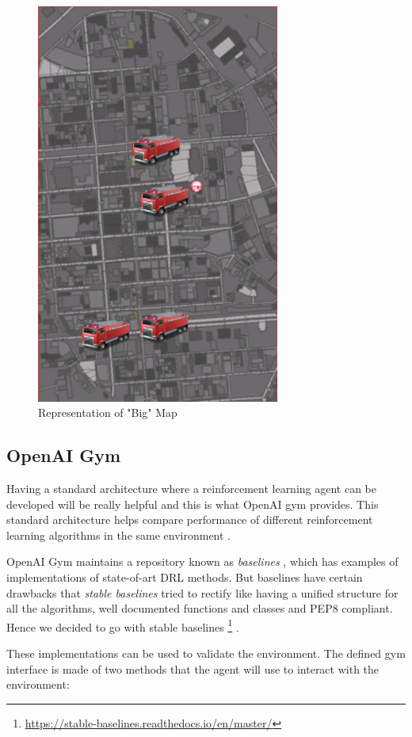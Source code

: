 \documentclass[12pt]{report}
\begin{document}
\begin{figure}[!h]
    \centering
    \includegraphics[width=8cm]{BigMap.png}
    \caption{Representation of "Big" Map}
    \label{fig:BigMap}
\end{figure}


\subsection{OpenAI Gym} \label{OpenAIGym}

Having a standard architecture where a reinforcement learning agent can be developed will be really helpful and this is what OpenAI gym provides. This standard architecture helps compare performance of different reinforcement learning algorithms in the same environment \cite{brockman2016openai}. 

OpenAI Gym maintains a repository known as \emph{baselines} \cite{baselines}, which has examples of implementations of state-of-art DRL methods. But baselines have certain drawbacks that \emph{stable baselines} tried to rectify like having a unified structure for all the algorithms, well documented functions and classes and PEP8 compliant. Hence we decided to go with stable baselines \footnote{\url{https://stable-baselines.readthedocs.io/en/master/}}  \cite{stable-baselines}. 

These implementations can be used to validate the environment. The defined gym interface is made of two methods that the agent will use to interact with the environment:
\end{document}
